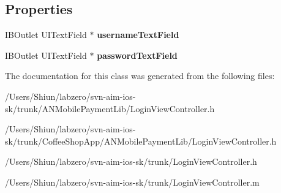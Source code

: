 \subsection*{Properties}
\begin{DoxyCompactItemize}
\item 
\hypertarget{interface_login_view_controller_aa87e9b5b7e1603070a1d34b9c106a61a}{
IBOutlet UITextField $\ast$ {\bfseries usernameTextField}}
\label{interface_login_view_controller_aa87e9b5b7e1603070a1d34b9c106a61a}

\item 
\hypertarget{interface_login_view_controller_a88559585bce650e75448c94bf2619e33}{
IBOutlet UITextField $\ast$ {\bfseries passwordTextField}}
\label{interface_login_view_controller_a88559585bce650e75448c94bf2619e33}

\end{DoxyCompactItemize}


The documentation for this class was generated from the following files:\begin{DoxyCompactItemize}
\item 
/Users/Shiun/labzero/svn-\/aim-\/ios-\/sk/trunk/ANMobilePaymentLib/LoginViewController.h\item 
/Users/Shiun/labzero/svn-\/aim-\/ios-\/sk/trunk/CoffeeShopApp/ANMobilePaymentLib/LoginViewController.h\item 
/Users/Shiun/labzero/svn-\/aim-\/ios-\/sk/trunk/LoginViewController.h\item 
/Users/Shiun/labzero/svn-\/aim-\/ios-\/sk/trunk/LoginViewController.m\end{DoxyCompactItemize}
